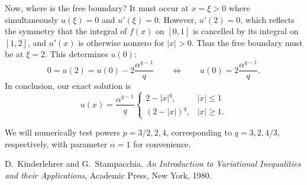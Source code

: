 \documentclass[11pt]{amsart}
\begin{document}
Now, where is the free boundary?  It must occur at $x=\xi>0$ where simultaneously $u(\xi)=0$ and $u'(\xi)=0$.  However, $u'(2)=0$, which reflects the symmetry that the integral of $f(x)$ on $[0,1]$ is cancelled by its integral on $[1,2]$, and $u'(x)$ is otherwise nonzero for $|x|>0$.  Thus the free boundary must be at $\xi=2$.  This determines $u(0)$:
    $$0=u(2) = u(0) - 2 \frac{\alpha^{q-1}}{q} \qquad \iff \qquad u(0) = 2 \frac{\alpha^{q-1}}{q}.$$
In conclusion, our exact solution is
\begin{equation}
\boxed{u(x) = \frac{\alpha^{q-1}}{q} \begin{cases} 2 - |x|^q, & |x| \le 1 \\
                                                   (2 - |x|)^q, & |x| \ge 1.\end{cases}}
\end{equation}

We will numerically test powers $p=3/2,2,4$, corresponding to $q=3,2,4/3$, respectively, with parameter $\alpha=1$ for convenience.

\begin{thebibliography}{1}

{\sc D.~Kinderlehrer and G.~Stampacchia}, {\em An {I}ntroduction to
  {V}ariational {I}nequalities and their {A}pplications}, Academic Press, New
  York, 1980.

\end{thebibliography}
\end{document}
